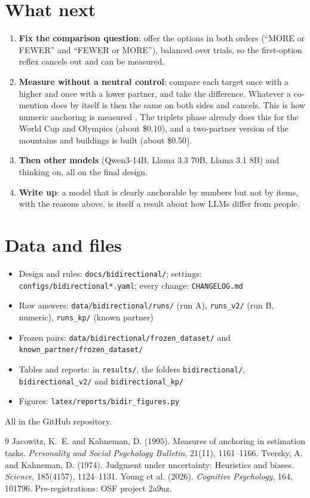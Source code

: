 \documentclass[11pt,a4paper]{article}
\begin{document}
\section{What next}
\begin{enumerate}[leftmargin=*]
  \item \textbf{Fix the comparison question}: offer the options in both orders (\enquote{MORE or FEWER} and \enquote{FEWER or MORE}), balanced over trials, so the first-option reflex cancels out and can be measured.
  \item \textbf{Measure without a neutral control}: compare each target once with a higher and once with a lower partner, and take the difference. Whatever a co-mention does by itself is then the same on both sides and cancels. This is how numeric anchoring is measured \citep{jacowitz1995measures}. The triplets phase already does this for the World Cup and Olympics (about \$0.10), and a two-partner version of the mountains and buildings is built (about \$0.50).
  \item \textbf{Then other models} (Qwen3-14B, Llama 3.3 70B, Llama 3.1 8B) and thinking on, all on the final design.
  \item \textbf{Write up}: a model that is clearly anchorable by numbers but not by items, with the reasons above, is itself a result about how LLMs differ from people.
\end{enumerate}

\section{Data and files}
\begin{itemize}[leftmargin=*]
  \item Design and rules: \texttt{docs/bidirectional/}; settings: \texttt{configs/bidirectional*.yaml}; every change: \texttt{CHANGELOG.md}
  \item Raw answers: \texttt{data/bidirectional/runs/} (run A), \texttt{runs\_v2/} (run B, numeric), \texttt{runs\_kp/} (known partner)
  \item Frozen pairs: \texttt{data/bidirectional/frozen\_dataset/} and \texttt{known\_partner/frozen\_dataset/}
  \item Tables and reports: in \texttt{results/}, the folders \texttt{bidirectional/}, \texttt{bidirectional\_v2/} and \texttt{bidirectional\_kp/}
  \item Figures: \texttt{latex/reports/bidir\_figures.py}
\end{itemize}
All in the GitHub repository.

\begin{thebibliography}{9}
Jacowitz, K.~E. and Kahneman, D. (1995). Measures of anchoring in estimation tasks. \emph{Personality and Social Psychology Bulletin}, 21(11), 1161--1166.
Tversky, A. and Kahneman, D. (1974). Judgment under uncertainty: Heuristics and biases. \emph{Science}, 185(4157), 1124--1131.
Young et al. (2026). \emph{Cognitive Psychology}, 164, 101796. Pre-registrations: OSF project 2a9nz.
\end{thebibliography}
\end{document}
